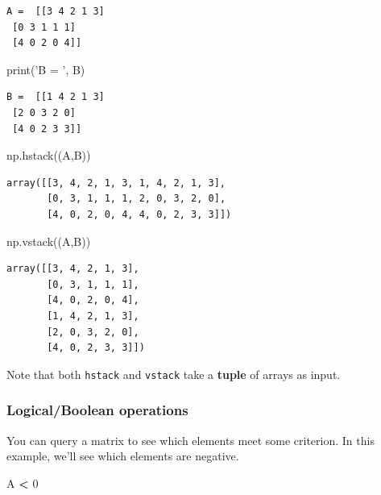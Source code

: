 \documentclass[
  letterpaper,
]{scrbook}
\newenvironment{Shaded}{\begin{snugshade}}{\end{snugshade}}
\newcommand{\BuiltInTok}[1]{#1}
\newcommand{\DecValTok}[1]{\textcolor[rgb]{0.00,0.00,0.81}{#1}}
\newcommand{\NormalTok}[1]{#1}
\newcommand{\OperatorTok}[1]{\textcolor[rgb]{0.81,0.36,0.00}{\textbf{#1}}}
\newcommand{\StringTok}[1]{\textcolor[rgb]{0.31,0.60,0.02}{#1}}
\begin{document}
\begin{verbatim}
A =  [[3 4 2 1 3]
 [0 3 1 1 1]
 [4 0 2 0 4]]
\end{verbatim}

\begin{Shaded}
\begin{Highlighting}[]
\BuiltInTok{print}\NormalTok{(}\StringTok{'B = '}\NormalTok{, B)}
\end{Highlighting}
\end{Shaded}

\begin{verbatim}
B =  [[1 4 2 1 3]
 [2 0 3 2 0]
 [4 0 2 3 3]]
\end{verbatim}

\begin{Shaded}
\begin{Highlighting}[]
\NormalTok{np.hstack((A,B))}
\end{Highlighting}
\end{Shaded}

\begin{verbatim}
array([[3, 4, 2, 1, 3, 1, 4, 2, 1, 3],
       [0, 3, 1, 1, 1, 2, 0, 3, 2, 0],
       [4, 0, 2, 0, 4, 4, 0, 2, 3, 3]])
\end{verbatim}

\begin{Shaded}
\begin{Highlighting}[]
\NormalTok{np.vstack((A,B))}
\end{Highlighting}
\end{Shaded}

\begin{verbatim}
array([[3, 4, 2, 1, 3],
       [0, 3, 1, 1, 1],
       [4, 0, 2, 0, 4],
       [1, 4, 2, 1, 3],
       [2, 0, 3, 2, 0],
       [4, 0, 2, 3, 3]])
\end{verbatim}

Note that both \texttt{hstack} and \texttt{vstack} take a \textbf{tuple} of arrays as input.

\hypertarget{logicalboolean-operations}{%
\subsubsection{Logical/Boolean operations}\label{logicalboolean-operations}}

You can query a matrix to see which elements meet some criterion. In this example, we'll see which elements are negative.

\begin{Shaded}
\begin{Highlighting}[]
\NormalTok{A }\OperatorTok{<} \DecValTok{0}
\end{Highlighting}
\end{Shaded}
\end{document}

